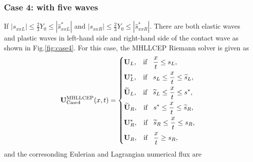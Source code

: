 \documentclass[review]{elsarticle}
\begin{document}
\subsubsection{Case 4: with five waves}
If $|s_{xxL}| \le \frac{2}{3}Y_0 \le  |\hat{s}_{xxL}^*|$ and  $|s_{xxR}| \le \frac{2}{3}Y_0 \le  |\hat{s}_{xxR}^*|$. There are  both elastic waves and plastic waves in left-hand side and right-hand side of the contact wave as shown in Fig.\ref{fig:case4}. For this case, the MHLLCEP Riemann solver is given as
 \begin{equation}
   \mathbf{U}^{\text{MHLLCEP}}_{\text{Case4}}(x,t) = \left\{ \begin{aligned}
        & \mathbf{U}_L, \hspace{0.3cm} \text{if} \hspace{0.3cm} \frac{x}{t}\le s_L, \\
        & \mathbf{U}_L^*, \hspace{0.3cm} \text{if} \hspace{0.3cm} s_L\le \frac{x}{t} \le \widetilde{s}_L, \\
        & \widetilde{\mathbf{U}}_L, \hspace{0.3cm} \text{if} \hspace{0.3cm} \widetilde{s}_L\le \frac{x}{t} \le s^*, \\
        & \widetilde{\mathbf{U}}_R, \hspace{0.3cm} \text{if} \hspace{0.3cm} s^*\le \frac{x}{t} \le \widetilde{s}_R, \\
        & \mathbf{U}_R^*, \hspace{0.3cm} \text{if} \hspace{0.3cm} \widetilde{s}_R\le \frac{x}{t} \le s_R,\\
        & \mathbf{U}_R, \hspace{0.3cm} \text{if} \hspace{0.3cm} \frac{x}{t}\ge s_R, \\
      \end{aligned}
    \right.
  \end{equation}
  and the corresonding Eulerian and Lagrangian numerical flux are
\end{document}
